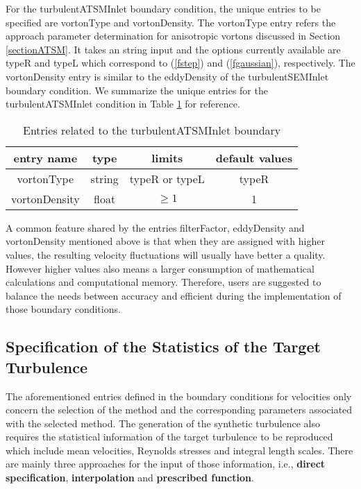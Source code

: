 For the \textcolor{mauve}{turbulentATSMInlet} boundary condition, the unique entries to be specified are \textcolor{mauve}{vortonType} and \textcolor{mauve}{vortonDensity}. The \textcolor{mauve}{vortonType} entry refers the approach parameter determination for anisotropic vortons discussed in Section \ref{sectionATSM}. It takes an string input and the options currently available are \textcolor{mauve}{typeR} and \textcolor{mauve}{typeL} which correspond to (\ref{fstep}) and (\ref{fgaussian}), respectively. The \textcolor{mauve}{vortonDensity} entry is similar to the \textcolor{mauve}{eddyDensity} of the \textcolor{mauve}{turbulentSEMInlet} boundary condition. We summarize the unique entries for the \textcolor{mauve}{turbulentATSMInlet} condition in Table \ref{entryVorton} for reference.

\begin{table}[H]
\centering
\begin{tabular}{c|c|c|c}
\hline
entry name & type & limits & default values \\
\hline
\textcolor{mauve}{vortonType} & string & typeR or typeL & typeR \\
\hline
\textcolor{mauve}{vortonDensity} & float & $\geq 1$ & 1 \\
\hline
\end{tabular} \caption{Entries related to the \textcolor{mauve}{turbulentATSMInlet} boundary}\label{entryVorton}
\end{table}


\noindent A common feature shared by the entries \textcolor{mauve}{filterFactor}, \textcolor{mauve}{eddyDensity} and \textcolor{mauve}{vortonDensity} mentioned above is that when they are assigned with higher values, the resulting velocity fluctuations will usually have better a quality. However higher values also means a larger consumption of mathematical calculations and computational memory. Therefore, users are suggested to balance the needs between accuracy and efficient during the implementation of those boundary conditions.


\subsection{Specification of the Statistics of the Target Turbulence}

The aforementioned entries defined in the boundary conditions for velocities only concern the selection of the method and the corresponding parameters associated with the selected method. The generation of the synthetic turbulence also requires the statistical information of the target turbulence to be reproduced which include mean velocities, Reynolds stresses and integral length scales. There are mainly three approaches for the input of those information, i.e., \textbf{direct specification}, \textbf{interpolation} and \textbf{prescribed function}.

